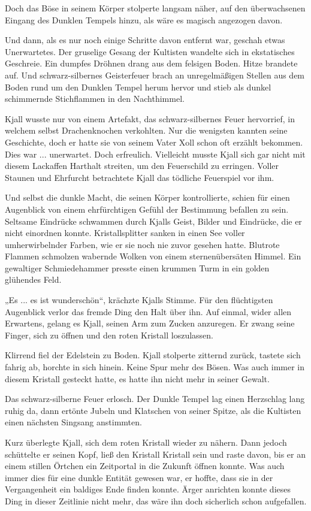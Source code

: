 \documentclass[10pt, a4paper, oneside]{book}
\begin{document}
Doch das Böse in seinem Körper stolperte langsam näher, auf den überwachsenen Eingang des Dunklen Tempels hinzu, als wäre es magisch angezogen davon.

Und dann, als es nur noch einige Schritte davon entfernt war, geschah etwas Unerwartetes. Der gruselige Gesang der Kultisten wandelte sich in ekstatisches Geschreie. Ein dumpfes Dröhnen drang aus dem felsigen Boden. Hitze brandete auf. Und schwarz-silbernes Geisterfeuer brach an unregelmäßigen Stellen aus dem Boden rund um den Dunklen Tempel herum hervor und stieb als dunkel schimmernde Stichflammen in den Nachthimmel.

Kjall wusste nur von einem Artefakt, das schwarz-silbernes Feuer hervorrief, in welchem selbst Drachenknochen verkohlten. Nur die wenigsten kannten seine Geschichte, doch er hatte sie von seinem Vater Xoll schon oft erzählt bekommen. Dies war ... unerwartet. Doch erfreulich. Vielleicht musste Kjall sich gar nicht mit diesem Lackaffen Harthalt streiten, um den Feuerschild zu erringen. Voller Staunen und Ehrfurcht betrachtete Kjall das tödliche Feuerspiel vor ihm.

Und selbst die dunkle Macht, die seinen Körper kontrollierte, schien für einen Augenblick von einem ehrfürchtigen Gefühl der Bestimmung befallen zu sein. Seltsame Eindrücke schwammen durch Kjalls Geist, Bilder und Eindrücke, die er nicht einordnen konnte. Kristallsplitter sanken in einen See voller umherwirbelnder Farben, wie er sie noch nie zuvor gesehen hatte. Blutrote Flammen schmolzen wabernde Wolken von einem sternenübersäten Himmel. Ein gewaltiger Schmiedehammer presste einen krummen Turm in ein golden glühendes Feld.

„Es ... es ist wunderschön“, krächzte Kjalls Stimme. Für den flüchtigsten Augenblick verlor das fremde Ding den Halt über ihn. Auf einmal, wider allen Erwartens, gelang es Kjall, seinen Arm zum Zucken anzuregen. Er zwang seine Finger, sich zu öffnen und den roten Kristall loszulassen.

Klirrend fiel der Edelstein zu Boden. Kjall stolperte zitternd zurück, tastete sich fahrig ab, horchte in sich hinein. Keine Spur mehr des Bösen. Was auch immer in diesem Kristall gesteckt hatte, es hatte ihn nicht mehr in seiner Gewalt.

Das schwarz-silberne Feuer erlosch. Der Dunkle Tempel lag einen Herzschlag lang ruhig da, dann ertönte Jubeln und Klatschen von seiner Spitze, als die Kultisten einen nächsten Singsang anstimmten.

Kurz überlegte Kjall, sich dem roten Kristall wieder zu nähern. Dann jedoch schüttelte er seinen Kopf, ließ den Kristall Kristall sein und raste davon, bis er an einem stillen Örtchen ein Zeitportal in die Zukunft öffnen konnte. Was auch immer dies für eine dunkle Entität gewesen war, er hoffte, dass sie in der Vergangenheit ein baldiges Ende finden konnte. Ärger anrichten konnte dieses Ding in dieser Zeitlinie nicht mehr, das wäre ihn doch sicherlich schon aufgefallen.
\end{document}
